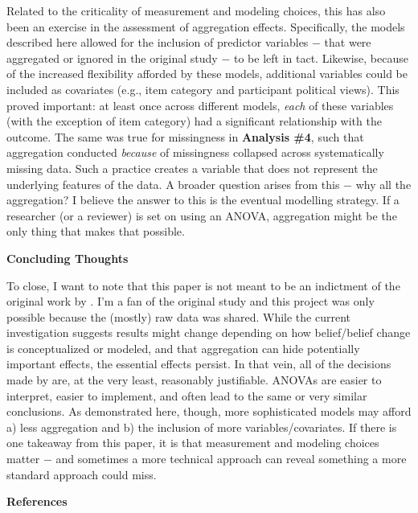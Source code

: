 \documentclass[12pt]{article}  %
\begin{document}
Related to the criticality of measurement and modeling choices, this has also been an exercise in the assessment of aggregation effects. Specifically, the models described here allowed for the inclusion of predictor variables $-$ that were aggregated or ignored in the original study $-$ to be left in tact. Likewise, because of the increased flexibility afforded by these models, additional variables could be included as covariates (e.g., item category and participant political views). This proved important: at least once across different models, \textit{each} of these variables (with the exception of item category) had a significant relationship with the outcome. The same was true for missingness in \textbf{Analysis \#4}, such that aggregation conducted \textit{because} of missingness collapsed across systematically missing data. Such a practice creates a variable that does not represent the underlying features of the data. A broader question arises from this $-$ why all the aggregation? I believe the answer to this is the eventual modelling strategy. If a researcher (or a reviewer) is set on using an ANOVA, aggregation might be the only thing that makes that possible.

\noindent\textbf{Concluding Thoughts}

To close, I want to note that this paper is not meant to be an indictment of the original work by \textcite{vlasceanu_synchronization_2020}. I'm a fan of the original study and this project was only possible because the (mostly) raw data was shared. While the current investigation suggests results might change depending on how belief/belief change is conceptualized or modeled, and that aggregation can hide potentially important effects, the essential effects persist. In that vein, all of the decisions made by \textcite{vlasceanu_synchronization_2020} are, at the very least, reasonably justifiable. ANOVAs are easier to interpret, easier to implement, and often lead to the same or very similar conclusions. As demonstrated here, though, more sophisticated models may afford a) less aggregation and b) the inclusion of more variables/covariates. If there is one takeaway from this paper, it is that measurement and modeling choices matter $-$ and sometimes a more technical approach can reveal something a more standard approach could miss.


\newpage

\begin{center}
    \textbf{References}
\end{center}
\end{document}
